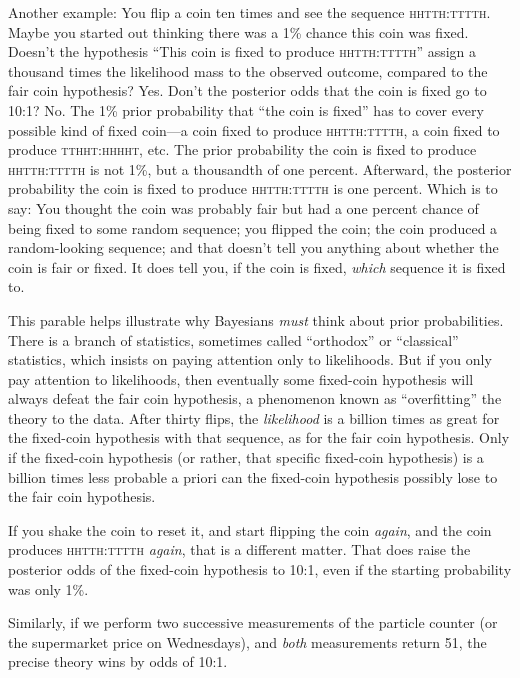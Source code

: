 {
 Another example: You flip a coin ten times and see the sequence
\textsc{hhtth:tttth}. Maybe you started out thinking there was a 1\% chance this
coin was fixed. Doesn't the hypothesis
``This coin is fixed to produce
\textsc{hhtth:tttth}'' assign a thousand times the likelihood
mass to the observed outcome, compared to the fair coin hypothesis?
Yes. Don't the posterior odds that the coin is fixed go
to 10:1? No. The 1\% prior probability that ``the coin
is fixed'' has to cover every possible kind of fixed
coin---a coin fixed to produce \textsc{hhtth:tttth}, a coin fixed to produce
\textsc{tthht:hhhht}, etc. The prior probability the coin is fixed to produce
\textsc{hhtth:tttth} is not 1\%, but a thousandth of one percent. Afterward, the
posterior probability the coin is fixed to produce \textsc{hhtth:tttth} is one
percent. Which is to say: You thought the coin was probably fair but
had a one percent chance of being fixed to some random sequence; you
flipped the coin; the coin produced a random-looking sequence; and that
doesn't tell you anything about whether the coin is
fair or fixed. It does tell you, if the coin is fixed, \textit{which}
sequence it is fixed to.}

{
 This parable helps illustrate why Bayesians \textit{must} think
about prior probabilities. There is a branch of statistics, sometimes
called ``orthodox'' or
``classical'' statistics, which
insists on paying attention only to likelihoods. But if you only pay
attention to likelihoods, then eventually some fixed-coin hypothesis
will always defeat the fair coin hypothesis, a phenomenon known as
``overfitting'' the theory to the
data. After thirty flips, the \textit{likelihood} is a billion times as
great for the fixed-coin hypothesis with that sequence, as for the fair
coin hypothesis. Only if the fixed-coin hypothesis (or rather, that
specific fixed-coin hypothesis) is a billion times less probable a
priori can the fixed-coin hypothesis possibly lose to the fair coin
hypothesis.}

{
 If you shake the coin to reset it, and start flipping the coin
\textit{again}, and the coin produces \textsc{hhtth:tttth} \textit{again}, that
is a different matter. That does raise the posterior odds of the
fixed-coin hypothesis to 10:1, even if the starting probability was
only 1\%.}

{
 Similarly, if we perform two successive measurements of the
particle counter (or the supermarket price on Wednesdays), and
\textit{both} measurements return 51, the precise theory wins by odds
of 10:1.}

